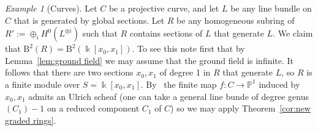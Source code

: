 \documentclass[12pt]{amsart}
\theoremstyle{definition}
\theoremstyle{remark}
\newtheorem{example}[lemma]{Example}
\newcommand{\kk}{\Bbbk}
\newcommand{\PP}{\mathbb{P}}
\newcommand{\VV}{\mathrm{V}}
\newcommand{\cc}{c}
\newcommand{\cE}{\mathcal{E}}
\newcommand{\FF}{\mathbf{F}}
\newcommand{\CQ}{\mathrm{C}}
\newcommand{\BBQ}{\mathrm{B}}
\newcommand{\david}[1]{{\color{red} \sf $\clubsuit\clubsuit\clubsuit$ David: [#1]}}
\begin{document}
%
%


\begin{example}[Curves] Let $C$ be a projective curve, and let $L$ be any line bundle on $C$ that is generated by global sections.
Let $R$ be any homogeneous subring of $R' := \oplus_{i}H^{0}(L^{\otimes i})$ such that $R$ 
contains sections of $L$ that generate $L$. We claim that $\BBQ^2(R)=\BBQ^2(\kk[x_0,x_1])$. To see this note first
that by Lemma~\ref{lem:ground field} we may assume that the ground field is infinite. It follows that there are
two sections $x_{0},x_{1}$ of degree 1 in $R$ that generate $L$, so $R$ is a finite module over $S = \kk[x_{0},x_{1}].$
By~\cite[Corollary~4.5]{eis-schrey-chow} the finite map $f: C\to \PP^{1}$ induced by $x_{0}, x_{1}$ admits
an Ulrich scheaf (one can take a general line bunde of degree genus$(C_{1})-1$ on a reduced component $C_{1}$ of $C$)
so we may apply Theorem~\ref{cor:new graded rings}.
\end{example}
\end{document}

